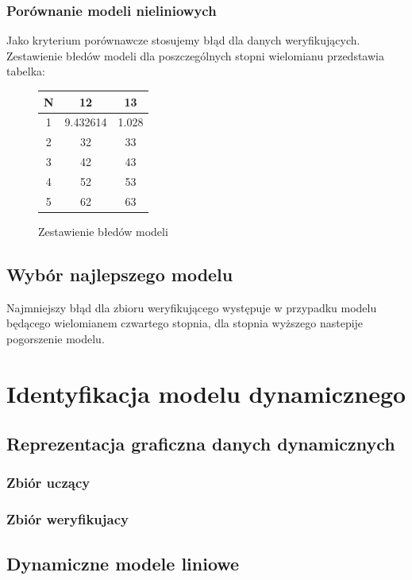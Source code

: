 \documentclass[a4paper, 11pt]{article}
\begin{document}
\subsubsection{Porównanie modeli nieliniowych}
Jako kryterium porównawcze stosujemy błąd dla danych weryfikujących. Zestawienie błedów modeli dla poszczególnych stopni wielomianu przedstawia tabelka: 
\begin{figure}[H]
\centering
\begin{tabular}{|c|c|c|}
\hline
	N & 12 & 13\\
\hline
	1 & 9.432614 & 1.028\\
\hline
	2 & 32 & 33\\
\hline
	3 & 42 & 43\\
\hline
	4 & 52 & 53\\
\hline
	5 & 62 & 63\\
\hline
\end{tabular}
\caption{Zestawienie błedów modeli}
\end{figure}
\subsection{Wybór najlepszego modelu}
Najmniejszy błąd dla zbioru weryfikującego występuje w przypadku modelu będącego wielomianem czwartego stopnia, dla stopnia wyższego nastepije pogorszenie modelu. 


\section{Identyfikacja modelu dynamicznego}
\subsection{Reprezentacja graficzna danych dynamicznych}
\subsubsection{Zbiór uczący}
\subsubsection{Zbiór weryfikujacy}
\subsection{Dynamiczne modele liniowe}
\end{document}
